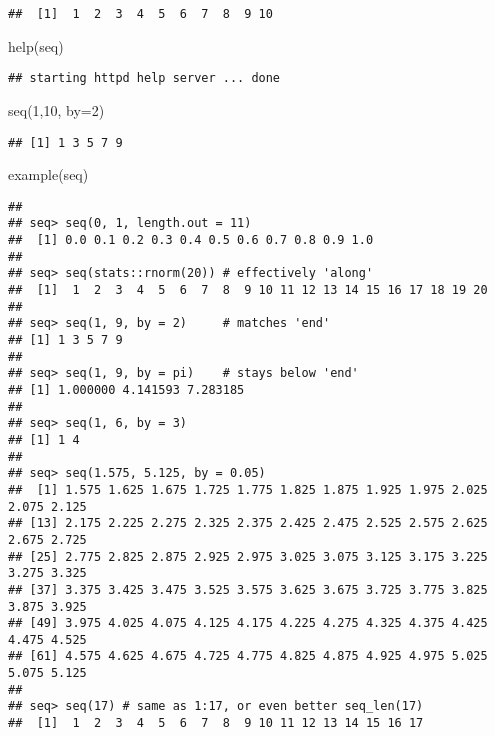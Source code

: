 \documentclass[
]{article}
\newenvironment{Shaded}{\begin{snugshade}}{\end{snugshade}}
\newcommand{\AttributeTok}[1]{\textcolor[rgb]{0.77,0.63,0.00}{#1}}
\newcommand{\DecValTok}[1]{\textcolor[rgb]{0.00,0.00,0.81}{#1}}
\newcommand{\FunctionTok}[1]{\textcolor[rgb]{0.00,0.00,0.00}{#1}}
\newcommand{\NormalTok}[1]{#1}
\begin{document}
\begin{verbatim}
##  [1]  1  2  3  4  5  6  7  8  9 10
\end{verbatim}

\begin{Shaded}
\begin{Highlighting}[]
\FunctionTok{help}\NormalTok{(seq)}
\end{Highlighting}
\end{Shaded}

\begin{verbatim}
## starting httpd help server ... done
\end{verbatim}

\begin{Shaded}
\begin{Highlighting}[]
\FunctionTok{seq}\NormalTok{(}\DecValTok{1}\NormalTok{,}\DecValTok{10}\NormalTok{, }\AttributeTok{by=}\DecValTok{2}\NormalTok{)}
\end{Highlighting}
\end{Shaded}

\begin{verbatim}
## [1] 1 3 5 7 9
\end{verbatim}

\begin{Shaded}
\begin{Highlighting}[]
\FunctionTok{example}\NormalTok{(seq)}
\end{Highlighting}
\end{Shaded}

\begin{verbatim}
## 
## seq> seq(0, 1, length.out = 11)
##  [1] 0.0 0.1 0.2 0.3 0.4 0.5 0.6 0.7 0.8 0.9 1.0
## 
## seq> seq(stats::rnorm(20)) # effectively 'along'
##  [1]  1  2  3  4  5  6  7  8  9 10 11 12 13 14 15 16 17 18 19 20
## 
## seq> seq(1, 9, by = 2)     # matches 'end'
## [1] 1 3 5 7 9
## 
## seq> seq(1, 9, by = pi)    # stays below 'end'
## [1] 1.000000 4.141593 7.283185
## 
## seq> seq(1, 6, by = 3)
## [1] 1 4
## 
## seq> seq(1.575, 5.125, by = 0.05)
##  [1] 1.575 1.625 1.675 1.725 1.775 1.825 1.875 1.925 1.975 2.025 2.075 2.125
## [13] 2.175 2.225 2.275 2.325 2.375 2.425 2.475 2.525 2.575 2.625 2.675 2.725
## [25] 2.775 2.825 2.875 2.925 2.975 3.025 3.075 3.125 3.175 3.225 3.275 3.325
## [37] 3.375 3.425 3.475 3.525 3.575 3.625 3.675 3.725 3.775 3.825 3.875 3.925
## [49] 3.975 4.025 4.075 4.125 4.175 4.225 4.275 4.325 4.375 4.425 4.475 4.525
## [61] 4.575 4.625 4.675 4.725 4.775 4.825 4.875 4.925 4.975 5.025 5.075 5.125
## 
## seq> seq(17) # same as 1:17, or even better seq_len(17)
##  [1]  1  2  3  4  5  6  7  8  9 10 11 12 13 14 15 16 17
\end{verbatim}
\end{document}
